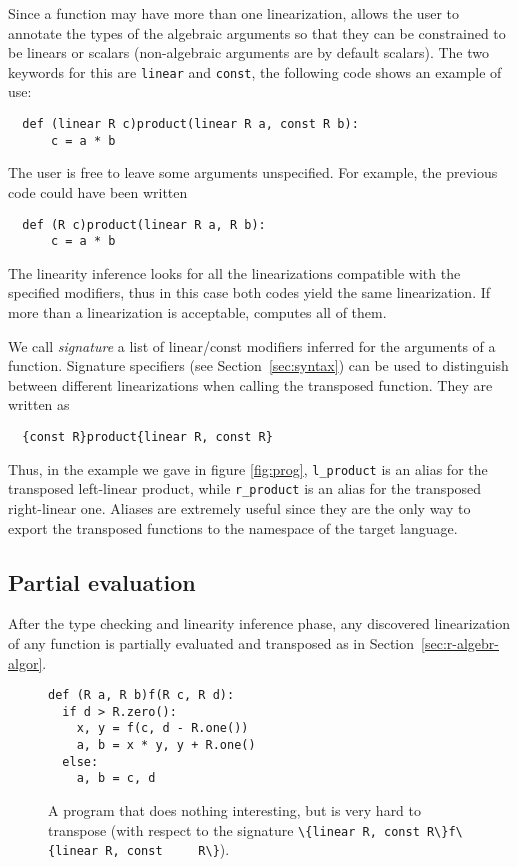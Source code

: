 Since a function may have more than one linearization, \tALpy{} allows
the user to annotate the types of the algebraic arguments so that they
can be constrained to be linears or scalars (non-algebraic arguments
are by default scalars). The two keywords for this are
\lstinline{linear} and \lstinline{const}, the following code shows an
example of use:
\begin{lstlisting}
  def (linear R c)product(linear R a, const R b):
      c = a * b
\end{lstlisting}

The user is free to leave some arguments unspecified. For example, the
previous code could have been written
\begin{lstlisting}
  def (R c)product(linear R a, R b):
      c = a * b
\end{lstlisting}
The linearity inference looks for all the linearizations compatible
with the specified modifiers, thus in this case both codes yield the
same linearization. If more than a linearization is acceptable,
\tALpy{} computes all of them.

\ifafourps\enlargethispage{\baselineskip}\fi
We call \emph{signature} a list of linear/const
modifiers inferred for the arguments of a function. Signature
specifiers (see Section~\ref{sec:syntax}) can be used to distinguish
between different linearizations when calling the transposed
function. They are written as
\begin{lstlisting}
  {const R}product{linear R, const R}
\end{lstlisting}

Thus, in the example we gave in figure \ref{fig:prog},
\lstinline+l_product+ is an alias for the transposed left-linear
product, while \lstinline+r_product+ is an alias for the transposed
right-linear one. Aliases are extremely useful since they are the only
way to export the transposed functions to the namespace of the target
language.




\subsection{Partial evaluation}
\label{sec:partial-evaluation-1}
After the type checking and linearity inference phase, any discovered
linearization of any function is partially evaluated and transposed as
in Section~\ref{sec:r-algebr-algor}.

\begin{figure}[b]
\begin{lstlisting}
def (R a, R b)f(R c, R d):
  if d > R.zero():
    x, y = f(c, d - R.one())
    a, b = x * y, y + R.one()
  else:
    a, b = c, d
\end{lstlisting}
  \caption{\label{fig:bad}A \tALpy{} program that does nothing
    interesting, but is very hard to transpose (with respect to the
    signature \lstinline+\{linear R, const R\}f\{linear R, const
    R\}+).}
\end{figure}


